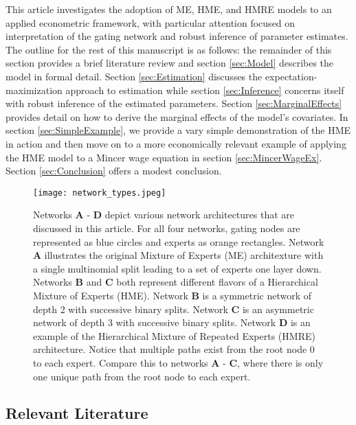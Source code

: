 \documentclass[12pt]{article}
\begin{document}
\bigskip

This article investigates the adoption of ME, HME, and HMRE models to an applied
econometric framework, with particular attention focused on interpretation of
the gating network and robust inference of parameter estimates. The outline for the
rest of this manuscript is as follows: the remainder of this section
provides a brief literature review and section \ref{sec:Model} describes
the model in formal detail. Section \ref{sec:Estimation} discusses the
expectation-maximization approach to estimation while section \ref{sec:Inference}
concerns itself with robust inference of the estimated parameters.
Section \ref{sec:MarginalEffects} provides detail on how to derive the
marginal effects of the model's covariates. In section \ref{sec:SimpleExample},
we provide a vary simple demonstration of the HME in action and then
move on to a more economically relevant example of applying the HME model to
a Mincer wage equation in section \ref{sec:MincerWageEx}. Section
\ref{sec:Conclusion} offers a modest conclusion.

\begin{figure}[!ht]
  \centering
  \texttt{[image: network\_types.jpeg]}
  \caption{Networks \textbf{A} - \textbf{D} depict various network
  architectures that are discussed in this article. For all four networks,
  gating nodes are represented as blue circles and experts as orange
  rectangles. Network \textbf{A} illustrates the original Mixture of
  Experts (ME) architexture with a single multinomial split leading
  to a set of experts one layer down. Networks \textbf{B} and \textbf{C} both
  represent different flavors of a Hierarchical Mixture of Experts (HME). Network
  \textbf{B} is a symmetric network of depth 2 with successive binary splits.
  Network \textbf{C} is an asymmetric network of depth 3 with successive
  binary splits. Network \textbf{D} is an example of the Hierarchical
  Mixture of Repeated Experts (HMRE) architecture. Notice that multiple paths
  exist from the root node $0$ to each expert. Compare this to networks
  \textbf{A} - \textbf{C}, where there is only one unique path from the root
  node to each expert.}
  \label{fig:network_comparison}
\end{figure}


\subsection{Relevant Literature}
\end{document}
